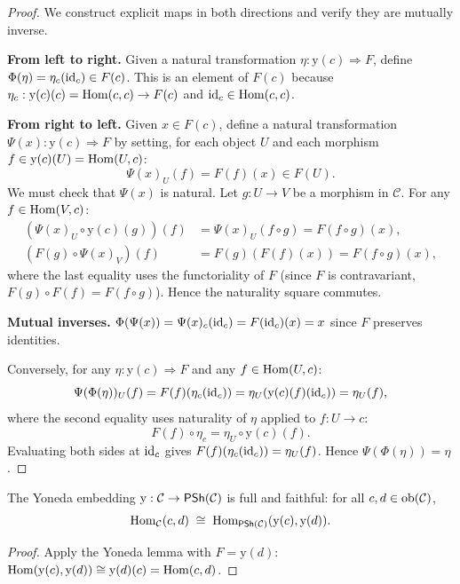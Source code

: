 \begin{proof}
We construct explicit maps in both directions and verify they are
mutually inverse.

\medskip\noindent\textbf{From left to right.}  Given a natural
transformation $\eta : \mathrm{y}(c) \Rightarrow F$, define
$\Phi(\eta) = \eta_c(\mathrm{id}_c) \in F(c)$.  This is an element of $F(c)$
because $\eta_c : \mathrm{y}(c)(c) = \mathrm{Hom}(c, c) \to F(c)$ and
$\mathrm{id}_c \in \mathrm{Hom}(c, c)$.

\medskip\noindent\textbf{From right to left.}  Given $x \in F(c)$,
define a natural transformation $\Psi(x) : \mathrm{y}(c) \Rightarrow F$
by setting, for each object $U$ and each morphism $f \in \mathrm{y}(c)(U) = \mathrm{Hom}(U, c)$:
\[
  \Psi(x)_U(f) = F(f)(x) \in F(U).
\]
We must check that $\Psi(x)$ is natural.  Let $g : U \to V$ be a
morphism in $\mathcal{C}$.  For any $f \in \mathrm{Hom}(V, c)$:
\begin{align*}
  (\Psi(x)_U \circ \mathrm{y}(c)(g))(f)
  &= \Psi(x)_U(f \circ g) = F(f \circ g)(x), \\
  (F(g) \circ \Psi(x)_V)(f)
  &= F(g)(F(f)(x)) = F(f \circ g)(x),
\end{align*}
where the last equality uses the functoriality of $F$ (since $F$ is
contravariant, $F(g) \circ F(f) = F(f \circ g)$).  Hence the
naturality square commutes.

\medskip\noindent\textbf{Mutual inverses.}
$\Phi(\Psi(x)) = \Psi(x)_c(\mathrm{id}_c) = F(\mathrm{id}_c)(x) = x$ since $F$
preserves identities.

Conversely, for any $\eta : \mathrm{y}(c) \Rightarrow F$ and any
$f \in \mathrm{Hom}(U, c)$:
\[
  \Psi(\Phi(\eta))_U(f) = F(f)(\eta_c(\mathrm{id}_c))
  = \eta_U(\mathrm{y}(c)(f)(\mathrm{id}_c))
  = \eta_U(f),
\]
where the second equality uses naturality of $\eta$ applied to $f : U \to c$:
\[
  F(f) \circ \eta_c = \eta_U \circ \mathrm{y}(c)(f).
\]
Evaluating both sides at $\mathrm{id}_c$ gives $F(f)(\eta_c(\mathrm{id}_c)) = \eta_U(f)$.
Hence $\Psi(\Phi(\eta)) = \eta$.
\end{proof}

\begin{corollary}
\label{cor:yoneda-ff}
The Yoneda embedding $\mathrm{y} : \mathcal{C} \to \mathsf{PSh}(\mathcal{C})$
is full and faithful: for all $c, d \in \mathrm{ob}(\mathcal{C})$,
\[
  \mathrm{Hom}_{\mathcal{C}}(c, d) \;\cong\;
  \mathrm{Hom}_{\mathsf{PSh}(\mathcal{C})}(\mathrm{y}(c), \mathrm{y}(d)).
\]
\end{corollary}

\begin{proof}
Apply the Yoneda lemma with $F = \mathrm{y}(d)$:
$\mathrm{Hom}(\mathrm{y}(c), \mathrm{y}(d)) \cong \mathrm{y}(d)(c) = \mathrm{Hom}(c, d)$.
\end{proof}

